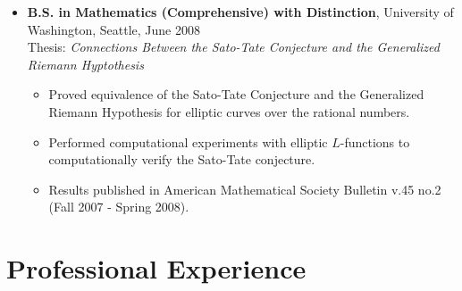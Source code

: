 \documentclass{article}
\begin{document}
\begin{itemize}
\begin{itemize*}
    \end{itemize*}
  \item {\bf B.S. in Mathematics (Comprehensive) with Distinction},
    University of Washington, Seattle, June 2008 \\ Thesis: {\it
      Connections Between the Sato-Tate Conjecture and the Generalized
      Riemann Hyptothesis} %
   \begin{itemize}
   \item Proved equivalence of the Sato-Tate Conjecture and the Generalized
     Riemann Hypothesis for elliptic curves over the rational numbers.
   \item Performed computational experiments with elliptic $L$-functions to
     computationally verify the Sato-Tate conjecture.
   \item Results published in American Mathematical Society Bulletin v.45 no.2
     (Fall 2007 - Spring 2008).
   \end{itemize}
\end{itemize}


\section*{Professional Experience}
\end{document}
